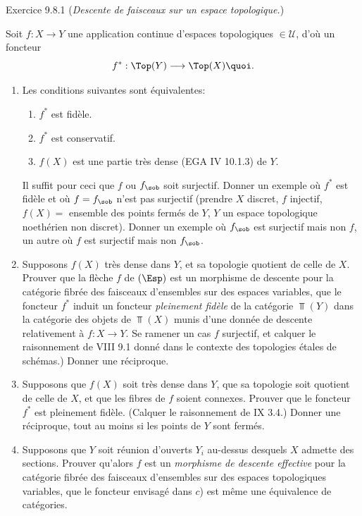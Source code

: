 \documentclass[10pt]{../fichiers-configuration-latex/smfart}
\begin{document}
\begin{enonce*}[remark]{Exercice 9.8.1}
(\emph{Descente de faisceaux sur un espace topologique.})

Soit $f:X\rightarrow Y$ une application continue d'espaces
topologiques $\in 𝒰$, d'où un foncteur
$$
f^{\ast}:\Top(Y)\longrightarrow \Top(X){\quoi}.
$$
\begin{enumerate}
\renewcommand{\theenumi}{\alph{enumi}}
\renewcommand{\labelenumi}{\theenumi)}
\item Les conditions suivantes sont équivalentes:
\begin{enumerate}
\renewcommand{\theenumii}{\roman{enumii}}
\renewcommand{\labelenumii}{(\theenumii)}
\item $f^{\ast}$ est fidèle.

\item $f^{\ast}$ est conservatif.

\item $f(X)$ est une partie très dense (EGA IV 10.1.3) de $Y$.
\end{enumerate}
Il suffit pour ceci que $f$ ou $f_{\sob}$ soit surjectif. Donner un
exemple où $f^{\ast}$ est fidèle et où $f=f_{\sob}$ n'est pas
surjectif (prendre $X$ discret, $f$ injectif, $f(X)=$ ensemble des
points fermés de $Y$, $Y$ un espace topologique noethérien non
discret). Donner un exemple où $f_{\sob}$ est surjectif mais non
$f$, un autre où $f$ est surjectif mais non $f_{\sob}$.

\item Supposons $f(X)$ très dense dans $Y$, et sa topologie quotient
de celle de $X$. Prouver que la flèche $f$ de $(\Esp)$ est un
morphisme de descente pour la catégorie fibrée des faisceaux
d'ensembles sur des espaces variables, \ie que le foncteur
$f^{\ast}$ induit un foncteur \emph{pleinement fidèle}\pageoriginale
de la catégorie $\Top(Y)$ dans la catégorie des objets de $\Top(X)$
munis d'une donnée de descente relativement à $f:X\rightarrow Y$. Se
ramener un cas $f$ surjectif, et calquer le raisonnement de VIII 9.1
donné dans le contexte des topologies étales de schémas.) Donner une
réciproque.

\item Supposons que $f(X)$ soit très dense dans $Y$, que sa topologie
soit quotient de celle de $X$, et que les fibres de $f$ soient
connexes. Prouver que le foncteur $f^{\ast}$ est pleinement fidèle.
(Calquer le raisonnement de  IX 3.4.) Donner une réciproque,
tout au moins si les points de $Y$ sont fermés.

\item Supposons que $Y$ soit réunion d'ouverts $Y_i$ au-dessus
desquels $X$ admette des sections. Prouver qu'alors $f$ est un
\emph{morphisme de descente effective} pour la catégorie fibrée des
faisceaux d'ensembles sur des espaces topologiques variables, \ie
que le foncteur envisagé dans $c$) est même une équivalence de
catégories.
\end{enumerate}
\end{enonce*}
\end{document}
